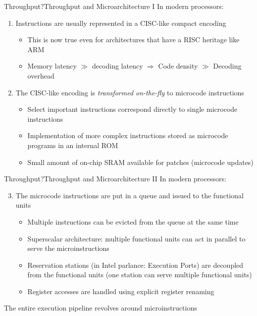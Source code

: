 \begin{frame}{Throughput?}{Throughput and Microarchitecture I}
In modern processors:
\begin{enumerate}
\item Instructions are usually represented in a \alert{CISC-like} compact encoding
	\begin{itemize}
	\item This is now true even for architectures that have a RISC heritage like ARM
	\item Memory latency $\gg$ decoding latency $\Rightarrow$ Code density $\gg$ Decoding overhead
	\end{itemize}
\item The CISC-like encoding is \emph{transformed on-the-fly} to \alert{microcode instructions}
	\begin{itemize}
	\item Select important instructions correspond directly to single microcode instructions
	\item Implementation of more complex instructions stored as \alert{microcode programs} in an internal ROM
	\item Small amount of on-chip SRAM available for patches (microcode updates)
	\end{itemize}
\end{enumerate}
\end{frame}


\begin{frame}{Throughput?}{Throughput and Microarchitecture II}
In modern processors:
\begin{enumerate}
\setcounter{enumi}{2}
\item The microcode instructions are put in a queue and issued to the functional units
\begin{itemize}
	\item Multiple instructions can be evicted from the queue at the same time
	\item Superscalar architecture: multiple \alert{functional units} can act in parallel to serve the microinstructions
	\item \alert{Reservation stations} (in Intel parlance: \alert{Execution Ports}) are decoupled from the functional units (one station can serve multiple functional units)
	\item Register accesses are handled using \alert{explicit register renaming}
	\end{itemize}
\end{enumerate}
\bigskip
The entire execution pipeline revolves around \alert{microinstructions}
\end{frame}


